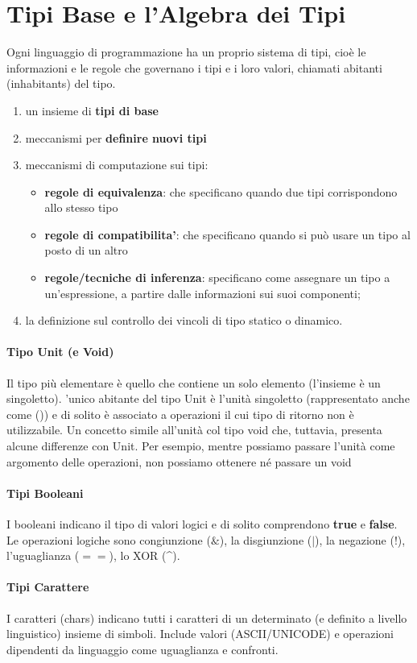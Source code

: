 \documentclass[a4paper,12pt]{article}
\begin{document}
\section{Tipi Base e l’Algebra dei Tipi}
Ogni linguaggio di programmazione ha un proprio sistema di tipi, cioè le informazioni e le regole
che governano i tipi e i loro valori, chiamati abitanti (inhabitants) del tipo.
\begin{enumerate}
  \item un insieme di \textbf{tipi di base}
  \item meccanismi per \textbf{definire nuovi tipi}
  \item meccanismi di computazione sui tipi:
  \begin{itemize}
    \item \textbf{regole di equivalenza}: che specificano quando due tipi corrispondono allo stesso tipo
    \item \textbf{regole di compatibilita'}: che specificano quando si può usare un tipo al posto di un altro
    \item \textbf{regole/tecniche di inferenza}: specificano come assegnare un tipo a un'espressione, a partire dalle informazioni sui suoi componenti;
  \end{itemize}
  \item la definizione sul controllo dei vincoli di tipo statico o dinamico.
\end{enumerate}
\paragraph{Tipo Unit (e Void)}
Il tipo più elementare è quello che contiene un solo elemento (l'insieme è un singoletto). 'unico abitante del tipo Unit è l'unità singoletto (rappresentato anche come ()) e di solito
è associato a operazioni il cui tipo di ritorno non è utilizzabile. Un concetto simile all’unità col tipo void che, tuttavia,
presenta alcune differenze con Unit. Per esempio, mentre possiamo passare l'unità come
argomento delle operazioni, non possiamo ottenere né passare un void
\paragraph{Tipi Booleani}
I booleani indicano il tipo di valori logici e di solito comprendono \textbf{true} e \textbf{false}. Le operazioni logiche sono congiunzione ($\&$), la disgiunzione ($|$), la negazione ($!$), l'uguaglianza ($==$), lo XOR (\^{}).
\paragraph{Tipi Carattere}
I caratteri (chars) indicano tutti i caratteri di un determinato (e
definito a livello linguistico) insieme di simboli. Include valori (ASCII/UNICODE) e operazioni dipendenti da linguaggio come uguaglianza e confronti.
\end{document}
